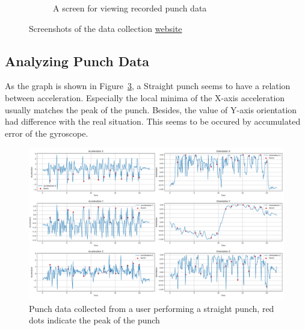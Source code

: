 \documentclass{article}
\begin{document}
\begin{figure}[h]
\begin{subfigure}{0.5\textwidth}
        \caption{A screen for viewing recorded punch data}
        \label{fig:data_collection_web_info}
    \end{subfigure}
    \caption{Screenshots of the data collection \href{https://punch-boxing.github.io/punch-data-collection-web/}{website}}
    \label{fig:data_collection_web_screenshots}
\end{figure}

\FloatBarrier
\subsection{Analyzing Punch Data}
As the graph is shown in Figure~\ref{fig:straight_user_input}, a Straight punch seems to have a relation between acceleration. Especially the local minima of the X-axis acceleration usually matches the peak of the punch. Besides, the value of Y-axis orientation had difference with the real situation. This seems to be occured by accumulated error of the gyroscope.

\FloatBarrier
\begin{figure}[h]
    \centering
    \includegraphics[width=\textwidth]{straight_user_input.png}
    \caption{Punch data collected from a user performing a straight punch, red dots indicate the peak of the punch}
    \label{fig:straight_user_input}
\end{figure}
\end{document}
